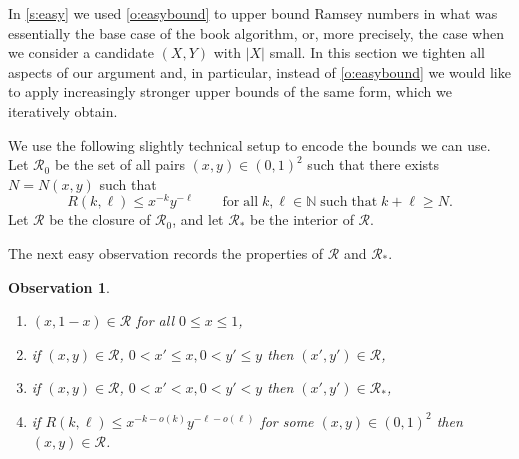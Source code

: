 \documentclass[reqno,final,12pt]{amsart}
\newtheorem{obs}[thm]{Observation}
\newcommand{\mc}[1]{\mathcal{#1}}
\newcommand{\bb}[1]{\mathbb{#1}}
\begin{document}
In \cref{s:easy} we used \cref{o:easybound} to upper bound Ramsey numbers in what was essentially the base case of the book algorithm, or, more precisely, the case when we consider a candidate $(X,Y)$ with $|X|$ small. In this section we tighten all aspects of our argument and, in  particular, instead of \cref{o:easybound} we would like to apply increasingly stronger upper bounds of the same form, which we iteratively obtain.

We use the following slightly technical setup to encode the bounds we can use. 
Let $\mc{R}_0$ be the set of all pairs $(x,y) \in (0,1)^2$ such that there exists $N=N(x,y)$ such that \begin{equation}\label{e:R} R(k,\ell) \leq x^{-k}y^{-\ell}  \qquad \mathrm{for \; all} \; k, \ell \in \bb{N} \; \mathrm{such\; that \;} k+\ell \geq N .\end{equation} Let $\mc{R}$ be the closure of $\mc{R}_0$, and let $\mc{R_*}$ be the interior of $\mc{R}$.

The next easy observation records the properties of $\mc{R}$ and $\mc{R_*}$.

\begin{obs}\label{o:r}
	\begin{enumerate}
		\item $(x,1-x) \in \mc{R}$ for all $0\leq x \leq 1$,
		\item if  $(x,y) \in \mc{R}$, $0 < x' \leq x, 0 < y' \leq y$  then $(x',y') \in \mc{R}$,
		\item if  $(x,y) \in \mc{R}$, $0 < x' < x, 0 < y'< y$  then $(x',y') \in \mc{R}_*$,
		\item if $R(k,\ell) \leq x^{-k-o(k)}y^{-\ell-o(\ell)}$ for some $(x,y) \in (0,1)^2$ then $(x,y) \in \mc{R}$.
	\end{enumerate}	
\end{obs}	
\end{document}
